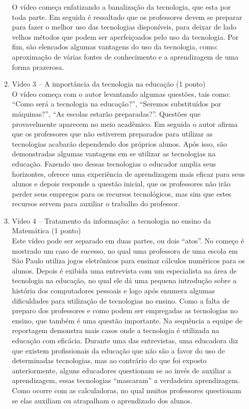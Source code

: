 \documentclass[a4paper, 12pt]{article}
\begin{document}
\begin{enumerate}
\begin{enumerate}
    O vídeo começa enfatizando a banalização da tecnologia, que esta por toda parte. Em seguida é ressaltado que os professores devem se preparar para fazer o melhor uso das tecnologias disponíveis, para deixar de lado velhos métodos que podem ser aperfeiçoados pelo uso da tecnologia.
    Por fim, são elencados algumas vantagens do uso da tecnologia, como: aproximação de várias fontes de conhecimento e a aprendizagem de uma forma prazerosa. \\
  \item Vídeo 3 – A importância da tecnologia na educação (1 ponto) \\ 
    O vídeo começa com o autor levantando algumas questões, tais como: ``Como será a tecnologia na educação?'', ``Seremos substituídos por máquinas?'', ``As escolas estarão preparadas?''. Questões que provavelmente aparecem no meio acadêmico. Em seguida o autor afirma que os professores que não estiverem preparados para utilizar as tecnologias acabarão dependendo dos próprios alunos. Após isso, são demonstradas algumas vantagens em se utilizar as tecnologias na educação. Fazendo uso dessas tecnologias o educador amplia seus horizontes, oferece uma experiência de aprendizagem mais eficaz para seus alunos e depois responde a questão inicial, que os professores não irão perder seus empregos para os recursos tecnológicos, mas sim que estes recursos servem para auxiliar o trabalho do professor.
  \item Vídeo 4 – Tratamento da informação: a tecnologia no ensino da Matemática (1 ponto) \\ 
    Este vídeo pode ser separado em duas partes, ou dois ``atos''. No começo é mostrado um caso de sucesso, no qual uma professora de uma escola em São Paulo utiliza jogos eletrônicos para ensinar cálculos numéricos para os alunos. Depois é exibida uma entrevista com um especialista na área de tecnologia na educação, no qual ele dá uma pequena introdução sobre a história dos computadores pessoais e logo após enumera algumas dificuldades para utilização de tecnologias no ensino. Como a falta de preparo dos professores e como podem ser empregadas as tecnologias no ensino, que também é uma questão importante.
    Na sequência a equipe de reportagem demonstra mais casos onde a tecnologia é utilizada na educação com eficácia. Durante uma das entrevistas, uma educadora diz que existem profissionais da educação que não são a favor do uso de determinadas tecnologias, mas ao contrário do que foi exposto anteriormente, alguns educadores questionam se ao invés de auxiliar a aprendizagem, essas tecnologias ``mascaram'' a verdadeira aprendizagem.  Como ocorre com as calculadoras, no qual muitos professores questionam se elas auxiliam ou atrapalham o aprendizado dos alunos.

\end{enumerate}
\end{enumerate}
\end{document}
